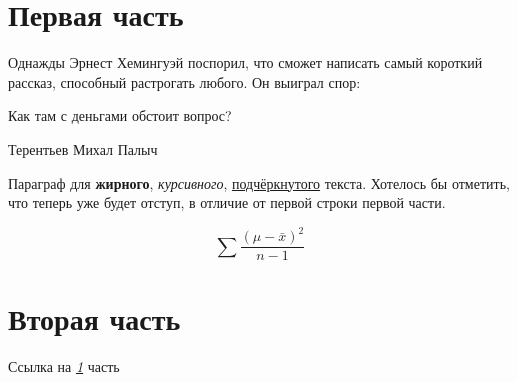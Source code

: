 \documentclass[a4paper,12pt]{article}
\begin{document}
\section{Первая часть}\label{sec:s1}
Однажды Эрнест Хемингуэй поспорил, что сможет написать самый короткий рассказ, способный растрогать любого. Он выиграл спор:\\

\epigraph{Как там с деньгами обстоит вопрос?}{Терентьев Михал Палыч}

Параграф для \textbf{жирного},
\textit{курсивного}, \underline{подчёркнутого}
текста. Хотелось бы отметить, что теперь уже будет отступ, в отличие от первой строки первой части.

\[
\sum{\frac{(\mu - \bar{x})^2}{n-1}}
\]

\section{Вторая часть}
Ссылка на \textit{\ref{sec:s1}} часть
\end{document}
